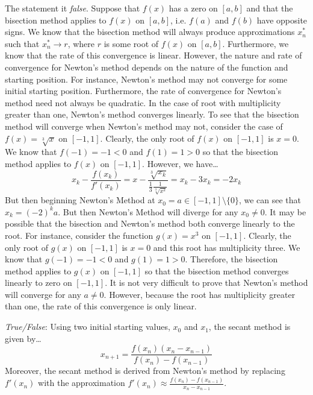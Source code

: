 \documentclass[11pt,letterpaper]{article}
\begin{document}
\sol The statement it \textit{false}. Suppose that $f(x)$ has a zero on $[a, b]$ and that the bisection method applies to $f(x)$ on $[a, b]$, i.e. $f(a)$ and $f(b)$ have opposite signs. We know that the bisection method will always produce approximations $x_n^*$ such that $x_n^* \to r$, where $r$ is some root of $f(x)$ on $[a, b]$. Furthermore, we know that the rate of this convergence is linear. However, the nature and rate of convergence for Newton's method depends on the nature of the function and starting position. For instance, Newton's method may not converge for some initial starting position. Furthermore, the rate of convergence for Newton's method need not always be quadratic. In the case of root with multiplicity greater than one, Newton's method converges linearly. To see that the bisection method will converge when Newton's method may not, consider the case of $f(x)= \sqrt[3]{x}$ on $[-1, 1]$. Clearly, the only root of $f(x)$ on $[-1, 1]$ is $x= 0$. We know that $f(-1)= -1 < 0$ and $f(1)= 1 > 0$ so that the bisection method applies to $f(x)$ on $[-1, 1]$. However, we have\dots
	\[
	x_k - \dfrac{f(x_k)}{f'(x_k)}= x - \dfrac{\sqrt[3]{x_k}}{\frac{1}{3} \frac{1}{\sqrt[3]{x^2}}}= x_k - 3x_k= -2x_k
	\]
But then beginning Newton's Method at $x_0= a \in [-1, 1] \setminus \{ 0 \}$, we can see that $x_k= (-2)^k a$. But then Newton's Method will diverge for any $x_0 \neq 0$. It may be possible that the bisection and Newton's method both converge linearly to the root. For instance, consider the function $g(x)= x^3$ on $[-1, 1]$. Clearly, the only root of $g(x)$ on $[-1, 1]$ is $x= 0$ and this root has multiplicity three. We know that $g(-1)= -1 < 0$ and $g(1)= 1 > 0$. Therefore, the bisection method applies to $g(x)$ on $[-1, 1]$ so that the bisection method converges linearly to zero on $[-1, 1]$. It is not very difficult to prove that Newton's method will converge for any $a \neq 0$. However, because the root has multiplicity greater than one, the rate of this convergence is only linear. \pvspace{1.3cm}



\quizsol \textit{True/False}: Using two initial starting values, $x_0$ and $x_1$, the secant method is given by\dots
	\[
	x_{n+1} = \dfrac{f(x_n) (x_n - x_{n-1})}{f(x_n) - f(x_{n-1})}
	\]
Moreover, the secant method is derived from Newton's method by replacing $f'(x_n)$ with the approximation $f'(x_n) \approx \frac{f(x_n) - f(x_{n-1})}{x_n - x_{n-1}}$. \pspace
\end{document}
